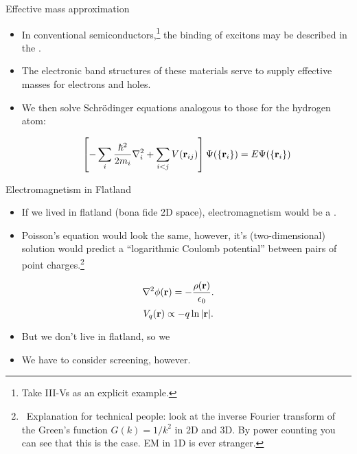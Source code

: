 \documentclass[12pt, pdf, hyperref={draft}, usenames, dvipsnames]{beamer}
\newcommand{\red}[1]{{\bf\color{LancsRed}{#1}}}
\newcommand{\blue}[1]{{\bf\color{NavyBlue}{#1}}}
\newcommand{\green}[1]{{\bf\color{ForestGreen}{#1}}}
\begin{document}
\begin{frame}{Effective mass approximation}

  \begin{itemize}

    \item In conventional semiconductors,\footnote{Take III-Vs as an explicit
    example.} the binding of excitons may be described in the \blue{effective mass
    approximation}.

    \item The electronic band structures of these materials serve
    to supply effective masses for electrons and holes.

    \item We then solve Schr\"{o}dinger equations analogous to those for the
    hydrogen atom:

    \begin{equation}
      \left[-\sum_i\dfrac{\hbar^2}{2m_i}\nabla^2_i + \sum_{i<j}V({\bf
      r}_{ij})\right]\Psi(\{{\bf r}_i\}) = E\Psi(\{{\bf r}_i\})
    \end{equation}

  \end{itemize}
\end{frame}



\begin{frame}{Electromagnetism in Flatland}
\begin{itemize}
  \item If we lived in flatland (bona fide 2D space), electromagnetism would
  be a \blue{very different beast}.
  \item Poisson's equation would look the same, however, it's (two-dimensional)
  solution would predict a ``logarithmic Coulomb potential'' between pairs of
  point charges.\footnote{\
  Explanation for technical people: look at the inverse Fourier transform of
  the Green's function $G({k})=1/k^2$ in 2D and 3D. By power counting you can
  see that this is the case. EM in 1D is ever stranger.}
\end{itemize}
\begin{equation}
  \nabla^2 \phi({\bf r}) = -\dfrac{\rho({\bf r})}{\epsilon_0}.
\end{equation}
\begin{equation}
  V_q({\bf r}) \propto -q\ln{\lvert {\bf r} \rvert}.
\end{equation}
\begin{itemize}
  \item But we don't live in flatland, so we \red{don't get this}
  \frownie\
  \item We \green{do} have to consider screening, however.
\end{itemize}
\end{frame}
\end{document}
